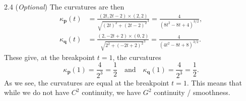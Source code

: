 \begin{solution}{2.4 (\textit{Optional})}
    The curvatures are then
    \begin{align*}
        \kappa_{\mathbf{p}}(t) &= \frac{(2t, 2t - 2) \times (2, 2)}{\sqrt{(2t)^2 + (2t - 2)^2}^3} = \frac{4}{(8t^2 - 8t + 4)^{3/2}}, \\
        \kappa_{\mathbf{q}}(t) &= \frac{(2, -2t + 2) \times (0, 2)}{\sqrt{2^2 + (-2t + 2)^2}^3} = \frac{4}{(4t^2 - 8t + 8)^{3/2}}.
    \end{align*}
    These give, at the breakpoint $t = 1$, the curvatures
    \begin{equation*}
        \kappa_{\mathbf{p}}(1) = \frac{4}{2^3} = \frac{1}{2}
        \quad \text{and} \quad
        \kappa_{\mathbf{q}}(1) = \frac{4}{2^3} = \frac{1}{2}.
    \end{equation*}
    As we see, the curvatures are equal at the breakpoint $t = 1$.
    This means that while we do not have $C^2$ continuity, we have $G^2$ continuity / smoothness.
\end{solution}